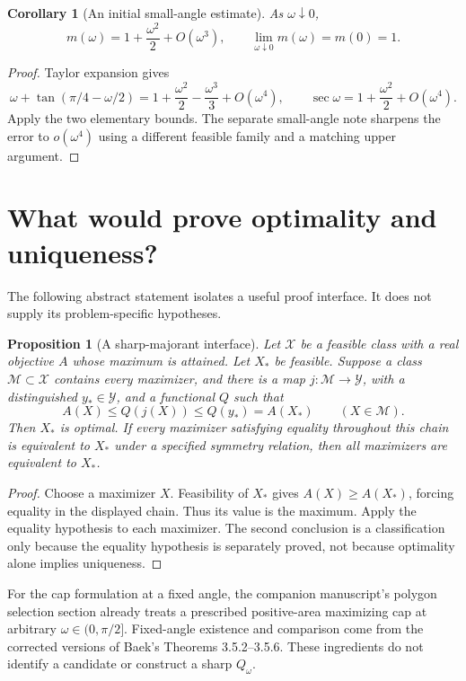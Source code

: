 \documentclass[11pt]{article}
\newtheorem{proposition}[theorem]{Proposition}
\newtheorem{corollary}[theorem]{Corollary}
\theoremstyle{remark}\newtheorem{remark}[theorem]{Remark}
\begin{document}
\begin{corollary}[An initial small-angle estimate]
As $\omega\downarrow0$,
\[
 m(\omega)=1+\frac{\omega^2}{2}+O(\omega^3),\qquad \lim_{\omega\downarrow0}m(\omega)=m(0)=1.
\]
\end{corollary}
\begin{proof}
Taylor expansion gives
\[
 \omega+\tan(\pi/4-\omega/2)=1+\frac{\omega^2}{2}-\frac{\omega^3}{3}+O(\omega^4),\qquad
 \sec\omega=1+\frac{\omega^2}{2}+O(\omega^4).
\]
Apply the two elementary bounds. The separate small-angle note sharpens the error to $o(\omega^4)$ using a different feasible family and a matching upper argument.
\end{proof}

\section{What would prove optimality and uniqueness?}
The following abstract statement isolates a useful proof interface. It does not supply its problem-specific hypotheses.

\begin{proposition}[A sharp-majorant interface]\label{prop:interface}
Let $\mathcal X$ be a feasible class with a real objective $A$ whose maximum is attained. Let $X_*$ be feasible. Suppose a class $\mathcal M\subset\mathcal X$ contains every maximizer, and there is a map $j:\mathcal M\to\mathcal Y$, with a distinguished $y_*\in\mathcal Y$, and a functional $Q$ such that
\[
 A(X)\le Q(j(X))\le Q(y_*)=A(X_*)\qquad(X\in\mathcal M).
\]
Then $X_*$ is optimal. If every maximizer satisfying equality throughout this chain is equivalent to $X_*$ under a specified symmetry relation, then all maximizers are equivalent to $X_*$.
\end{proposition}
\begin{proof}
Choose a maximizer $X$. Feasibility of $X_*$ gives $A(X)\ge A(X_*)$, forcing equality in the displayed chain. Thus its value is the maximum. Apply the equality hypothesis to each maximizer. The second conclusion is a classification only because the equality hypothesis is separately proved, not because optimality alone implies uniqueness.
\end{proof}

For the cap formulation at a fixed angle, the companion manuscript's polygon selection section already treats a prescribed positive-area maximizing cap at arbitrary $\omega\in(0,\pi/2]$. Fixed-angle existence and comparison come from the corrected versions of Baek's Theorems 3.5.2--3.5.6. These ingredients do not identify a candidate or construct a sharp $Q_\omega$.
\end{document}
